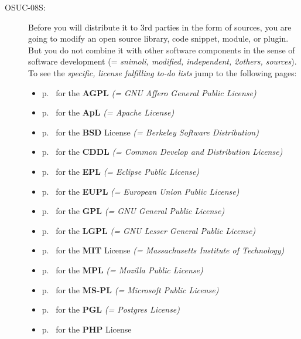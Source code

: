 \begin{description}
\item[OSUC-08S:]\label{OSUC-08S-DEF} Before you will distribute it to 3rd
parties in the form of sources, you are going to modify an open source library,
code snippet, module, or plugin. But you do not combine it with other software
components in the sense of software development (= \textit{snimoli, modified,
independent, 2others, sources}). To see the \textit{specific, license fulfilling
to-do lists} jump to the following pages:
  \begin{itemize}
    \item p.\ \pageref{OSUC-08S-AGPL} for the \textbf{AGPL}
      \textit{(= GNU Affero General Public License)} 
    \item p.\ \pageref{OSUC-08S-Apache20} for the \textbf{ApL}
      \textit{(= Apache License)}
    \item p.\ \pageref{OSUC-08S-BSD} for the \textbf{BSD} License
      \textit{(= Berkeley Software Distribution)}
    \item p.\ \pageref{OSUC-08S-CDDL} for the \textbf{CDDL}
      \textit{(= Common Develop and Distribution License)}  
    \item p.\ \pageref{OSUC-08S-EPL} for the \textbf{EPL}
      \textit{(= Eclipse Public License)}     
    \item p.\ \pageref{OSUC-08S-EUPL} for the \textbf{EUPL}
      \textit{(= European Union Public License)} 
    \item p.\ \pageref{OSUC-08S-GPL} for the \textbf{GPL}
       \textit{(= GNU General Public License)} 
    \item p.\ \pageref{OSUC-08S-LGPL} for the \textbf{LGPL}
      \textit{(= GNU Lesser General Public License)}           
    \item p.\ \pageref{OSUC-08S-MIT} for the \textbf{MIT} License
       \textit{(= Massachusetts Institute of Technology)} 
    \item p.\ \pageref{OSUC-08S-MPL} for the \textbf{MPL}
      \textit{(= Mozilla Public License)}     
    \item p.\ \pageref{OSUC-08S-MS-PL} for the \textbf{MS-PL}
      \textit{(= Microsoft Public License)} 
    \item p.\ \pageref{OSUC-08S-PGL} for the \textbf{PGL}
      \textit{(= Postgres License)} 
    \item p.\ \pageref{OSUC-08S-PHP} for the \textbf{PHP} License 
  \end{itemize}


\end{description}
